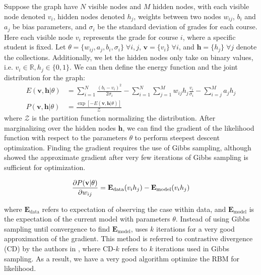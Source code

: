 Suppose the graph have $N$ visible nodes and $M$ hidden nodes,
with each visible node denoted $v_i$, hidden nodes denoted $h_j$, 
weights between two nodes $w_{ij}$,
$b_i$ and $a_j$ be bias parameters,
and $\sigma_i$ be the standard deviation of grades for each course.
Here each visible node $v_i$ represents the grade for course $i$,
where a specific student is fixed.
Let $\theta = \{ w_{ij},a_j,b_i,\sigma_i \} \; \forall i,j$,
$\mathbf{v} = \{v_i\} \; \forall i$,
and $\mathbf{h} = \{h_j\} \; \forall j$ denote the collections.
Additionally, we let the hidden nodes only take on binary values, 
i.e. $v_i \in \mathbb{R}, h_j \in \{0,1\}$.
We can then define the energy function and 
the joint distribution for the graph:
%
\begin{equation*}
\begin{aligned}
    E(\mathbf{v},\mathbf{h}|\theta) &= 
        \displaystyle\sum_{i=1}^N \frac{(b_i - v_i)^2}{2 \sigma_i}
        - \displaystyle\sum_{i=1}^N \displaystyle\sum_{j=1}^M
             w_{ij} h_j \frac{v_i}{\sigma_i}
        - \displaystyle\sum_{i=j}^M a_j h_j \\
%
%
    P(\mathbf{v},\mathbf{h}|\theta) &= 
        \frac{\exp\left[-E(\mathbf{v},\mathbf{h}|\theta)\right]}
        {\mathcal{Z}}
\end{aligned}
\end{equation*}
%
where $\mathcal{Z}$ is the partition function normalizing
the distribution.
After marginalizing over the hidden nodes $\mathbf{h}$, 
we can find the gradient of the likelihood function
with respect to the parameters $\theta$
to perform steepest descent optimization.
Finding the gradient requires the use of Gibbs sampling,
although \cite{SaMnHi07} showed the approximate gradient
after very few iterations of Gibbs sampling is sufficient 
for optimization.

\begin{equation*}
    \frac{\partial P(\mathbf{v}|\theta)}{\partial w_{ij}} = 
        \mathbf{E}_{\text{data}} (v_i h_j) -
        \mathbf{E}_{\text{model}} (v_i h_j)
\end{equation*}

where $\mathbf{E}_{\text{data}}$ refers to expectation 
of observing the case within data,
and $\mathbf{E}_{\text{model}}$ is the expectation of 
the current model with parameters $\theta$.
Instead of using Gibbs sampling until convergence to find 
$\mathbf{E}_{\text{model}}$, 
\cite{SaMnHi07} uses $k$ iterations for a very good approximation
of the gradient.
This method is referred to contrastive divergence (CD) by the 
authors in \cite{SaMnHi07}, where CD-$k$ refers to $k$ iterations
used in Gibbs sampling.
As a result, we have a very good algorithm optimize the
RBM for likelihood.


